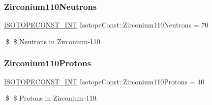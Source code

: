 \subsubsection{\texorpdfstring{Zirconium110\+Neutrons}{Zirconium110Neutrons}}
{\footnotesize\ttfamily \mbox{\hyperlink{group___isotope_const-_macros_ga5f18360b3e99483a35c32d789e62621c}{I\+S\+O\+T\+O\+P\+E\+C\+O\+N\+S\+T\+\_\+\+I\+NT}} Isotope\+Const\+::\+Zirconium110\+Neutrons = 70}

\$ \$ Neutrons in Zirconium-\/110. \mbox{\label{group___isotope_const-_zirconium-_zr110_ga506bb9265d02934eeef396f89938afa1}} 
\subsubsection{\texorpdfstring{Zirconium110\+Protons}{Zirconium110Protons}}
{\footnotesize\ttfamily \mbox{\hyperlink{group___isotope_const-_macros_ga5f18360b3e99483a35c32d789e62621c}{I\+S\+O\+T\+O\+P\+E\+C\+O\+N\+S\+T\+\_\+\+I\+NT}} Isotope\+Const\+::\+Zirconium110\+Protons = 40}

\$ \$ Protons in Zirconium-\/110. 